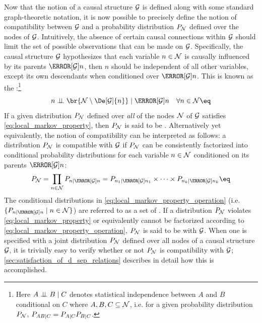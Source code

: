 \documentclass[aps, 10pt, english, twoside, pra, nofootinbib, tightenlines, longbibliography, superscriptaddress]{revtex4-1}
\begin{document}
    Now that the notion of a causal structure $\mathcal{G}$ is defined along with some standard graph-theoretic notation, it is now possible to precisely define the notion of compatibility between $\mathcal{G}$ and a probability distribution $\prob[\nodes]$ defined over the nodes of $\mathcal{G}$. Intuitively, the absence of certain causal connections within $\mathcal{G}$ should limit the set of possible observations that can be made on $\mathcal{G}$. Specifically, the causal structure $\mathcal{G}$ hypothesizes that each variable $n \in \mathcal{N}$ is causally influenced by its parents $\Pa[\graph]{n}$, then $n$ should be independent of all other variables, except its own descendants when conditioned over $\Pa[\graph]{n}$. This is known as the :\footnote{Here $A \perp\!\!\!\perp B \mid C$ denotes statistical independence between $A$ and $B$ conditional on $C$ where $A,B,C \subseteq \mathcal{N}$, i.e. for a given probability distribution $\prob[\nodes]$, $\prob[AB \mid C] = \prob[A \mid C]\prob[B \mid C]$.}
    \[ n \indep \br{\nodes \setminus \De[\graph]{n}} \mid \Pa[\graph]{n} \quad \forall n \in \nodes \eq \label{eq:local_markov_property} \]
    If a given distribution $\prob[\nodes]$ defined over \textit{all} of the nodes $\mathcal{N}$ of $\mathcal{G}$ satisfies \cref{eq:local_markov_property}, then $\prob[\nodes]$ is said to be . Alternatively yet equivalently, the notion of compatibility can be interpreted as follows: a distribution $\prob[\nodes]$ is compatible with $\mathcal{G}$ if $\prob[\nodes]$ can be consistently factorized into conditional probability distributions for each variable $n \in \mathcal{N}$ conditioned on its parents $\Pa[\graph]{n}$:
    \[ \prob[\nodes] = \prod_{n \in \nodes} \prob[n \mid \Pa[\graph]{n}] = \prob[n_1 \mid \Pa[\graph]{n_1}] \times \cdots \times \prob[n_k \mid \Pa[\graph]{n_k}] \eq \label{eq:local_markov_property_operation}\]
    The conditional distributions in \cref{eq:local_markov_property_operation} (i.e. $\{\prob[n \mid \Pa[\graph]{n}] \mid n \in \nodes\}$) are referred to as a set of . If a distribution $\prob[\nodes]$ violates \cref{eq:local_markov_property} or equivalently cannot be factorized according to \cref{eq:local_markov_property_operation}, $\prob[\nodes]$ is said to be  with $\mathcal{G}$. When one is specified with a joint distribution $\prob[\nodes]$ defined over all nodes of a causal structure $\mathcal{G}$, it is trivially easy to verify whether or not $\prob[\nodes]$ is compatibility with $\mathcal{G}$; \cref{sec:satisfaction_of_d_sep_relations} describes in detail how this is accomplished.
\end{document}
